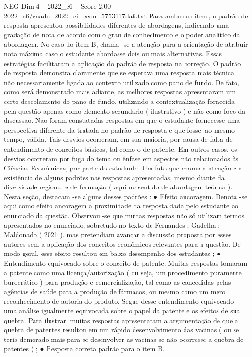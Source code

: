 \begin{textsample}{NEG Dim 4 – 2022\_c6 – Score 2.00 – 2022\_c6/enade\_2022\_ci\_econ\_5753117da6.txt}
Para ambos os itens, o padrão de resposta apresentou possibilidades diferentes de abordagens, indicando uma gradação de nota de acordo com o grau de conhecimento e o poder analítico da abordagem.
No caso do item B, chama -se a atenção para a orientação de atribuir nota máxima caso o estudante abordasse dois ou mais alternativas.
Essas estratégias facilitaram a aplicação do padrão de resposta na correção.
O padrão de resposta demonstra claramente que se esperava uma resposta mais técnica, não necessariamente ligada ao contexto utilizado como pano de fundo.
De fato, como será demonstrado mais adiante, as melhores respostas apresentaram um certo descolamento do pano de fundo, utilizando a contextualização fornecida pela questão apenas como elemento secundário ( ilustrativo ) e não como foco da discussão.
Não foram constatadas respostas em que o estudante fornecesse uma perspectiva diferente da tratada no padrão de resposta e que fosse, ao mesmo tempo, válida.
Tais desvios ocorreram, em sua maioria, por causa de falta de entendimento de conceitos básicos, tal como o de patente.
Em outros casos, os desvios ocorreram por fuga do tema ou ênfase em aspectos não relacionados às Ciências Econômicas, por parte do estudante.
Um fato que chama a atenção é a existência de alguns padrões nas respostas apresentadas, mesmo diante da diversidade regional e de formação ( aqui no sentido de abordagem teórica ).
Nesta seção, destacam -se alguns desses padrões : {\EmojiFont ●} Efeito ancoragem.
Denota -se aqui como efeito ancoragem a proximidade da resposta dada pelo estudante ao enunciado da questão.
Observou -se que muitas respostas não só utilizam termos apresentados no enunciado, sobretudo no texto de Fernandes ; Gadelha ; Maldonado ( 2021 ), mas pretendiam avançar a discussão proposta por esses autores sem a aplicação dos conceitos econômicos relevantes para a questão.
De modo geral, esse efeito resultou em baixo desempenho dos estudantes ; {\EmojiFont ●} Entendimento equivocado sobre o conceito de patente.
Muitas respostas tomaram a patente como uma licença/autorização ( ou seja, um procedimento puramente burocrático ) para produção e comercialização, tal como as concedidas pelas agências de saúde para a produção de fármacos, ou mesmo como um mero reconhecimento de autoria do produto.
Segue desse entendimento equivocado uma análise igualmente equivocada sobre o papel da patente e os efeitos de sua quebra.
Para ilustrar, muitas respostas apresentaram a argumentação de que a quebra de patentes resultou em um rápido desenvolvimento das vacinas ( ou se teria demorado mais para se desenvolver as vacinas se não ocorresse a quebra de patentes ) ; {\EmojiFont ●} Resposta correta padrão para o item B.

\end{textsample}
